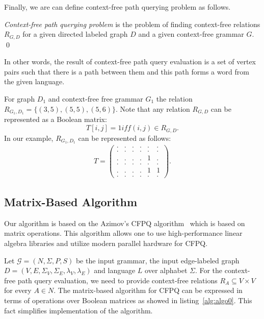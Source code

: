 Finally, we are can define context-free path querying problem as follows. 
\begin{definition}
    \emph{Context-free path querying problem} is the problem of finding context-free relations $R_{G, D}$ for a given directed labeled graph $D$ and a given context-free grammar $G$. \qed
\end{definition} 

In other words, the result of context-free path query evaluation is a set of vertex pairs such that there is a path between them and this path forms a word from the given language.
    
For graph $D_1$ and context-free free grammar $G_1$ the relation $R_{G_1, D_1} = \{(3, 5), (5, 5), (5,6)\}$. 
Note that any relation $R_{G, D}$ can be represented as a Boolean matrix: $$T[i,j] = 1 iff (i,j) \in R_{G, D}.$$
In our example, $R_{G_1, D_1}$ can be represented as follows:
\begin{align*}
T =
\begin{pmatrix}
    . & . & . & . & . & . \\
    . & . & . & . & . & . \\
    . & . & . & . & 1 & . \\
    . & . & . & . & . & . \\ 
    . & . & . & . & 1 & 1 \\ 
    . & . & . & . & . & .
\end{pmatrix}.
\end{align*}

 
\subsection{Matrix-Based Algorithm}
Our algorithm is based on the Azimov's CFPQ algorithm~\cite{Azimov:2018:CPQ:3210259.3210264} which is based on matrix operations.
This algorithm allows one to use high-performance linear algebra libraries and utilize modern parallel hardware for CFPQ.

Let $\mathcal{G} = (N, \Sigma, P, S)$ be the input grammar, the input edge-labeled graph $D = (V, E, \Sigma_V, \Sigma_E, \lambda_V, \lambda_E)$ and language $L$ over alphabet $\Sigma$. For the context-free path query evaluation, we need to provide context-free relations \mbox{$R_A \subseteq V \times V$} for every \mbox{$A \in N$}.
The matrix-based algorithm for CFPQ can be expressed in terms of operations over Boolean matrices as showed in listing~\ref{alg:algo0}. This fact simplifies implementation of the algorithm.

